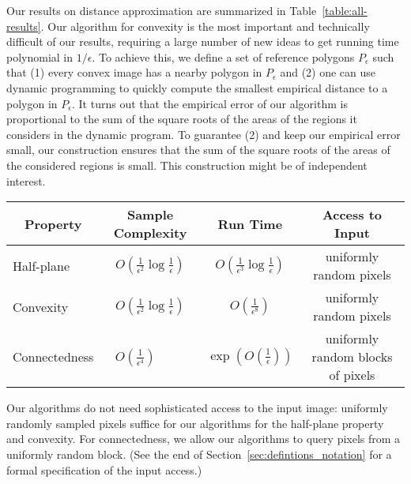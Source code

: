 \documentclass[11pt,english]{article}
\numberwithin{figure}{section}
\newcommand{\eps}{{\epsilon}}
\newcommand{\mydelta}{\epsilon} \newcommand{\bigdelta}{{\epsilon_0}} \newcommand{\dsquares}{d_{\rm squares}}
\begin{document}
Our results on distance approximation are summarized  in Table~\ref{table:all-results}. Our algorithm for convexity is the most important and technically difficult of our results, requiring a large number of new ideas to get running time polynomial in $1/\eps.$ To achieve this, we define a set of reference polygons  $P_\mydelta$ such that (1) every convex image has a nearby polygon in $P_\mydelta$ and (2) one can use dynamic programming to quickly compute the smallest empirical distance to a polygon in $P_\mydelta$. It turns out that the empirical error of our algorithm is proportional to the sum of the square roots of the areas of the regions it considers in the dynamic program. To guarantee (2) and keep our empirical error small, our construction ensures that the sum of the square roots of the areas of the considered regions is small.
This construction might be of independent interest.
\begin{table*}[t]
\begin{center}
\begin{tabular}{| l || c | c| c |}
\hline
\multicolumn{1}{|c||}{Property}& Sample Complexity &  Run Time & Access to Input
\\
\hline
Half-plane  &  $O\left(\frac 1 {\mydelta^2} \log \frac 1 \mydelta\right)$ & $O\left(\frac 1 {\mydelta^3} \log \frac 1 \mydelta\right)$ & uniformly random pixels
\\
Convexity &  $O\left(\frac 1 {\mydelta^2} \log \frac 1 \mydelta\right)$ & $O\left(\frac 1 {\mydelta^8} \right)$ & uniformly random pixels
\\
Connectedness &  $O\left(\frac 1 {\mydelta^4} \right)$ \ \ \ \ & $\exp\left(O\left(\frac 1 \mydelta \right)\right)$ &uniformly random blocks of pixels
\\
\hline
\end{tabular}
\end{center}
\caption{Our results on distance approximation.
To get complexity of $(\eps_1,\eps_2)$-tolerant testing, substitute $\mydelta=(\eps_2-\eps_1)/2$.
}
\label{table:all-results}
\end{table*}
Our algorithms do not need sophisticated access to the input image: uniformly randomly sampled pixels suffice for our algorithms for the half-plane property and convexity. For connectedness, we allow our algorithms to query pixels from a uniformly random block. (See the end of Section~\ref{sec:defintions_notation} for a formal specification of the input access.)
\end{document}
